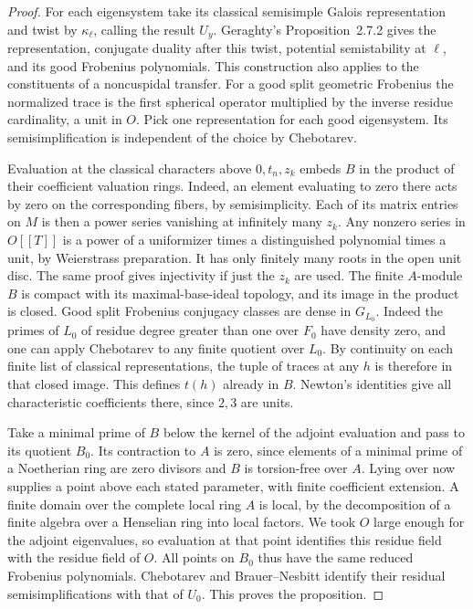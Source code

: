 \documentclass[a4paper,11pt]{article}
\theoremstyle{definition}
\theoremstyle{remark}
\numberwithin{equation}{section}
\begin{document}
\begin{proof}
For each eigensystem take its classical semisimple Galois
representation and twist by \(\kappa_\ell\), calling the result
\(U_y\). Geraghty's Proposition~2.7.2 gives the representation,
conjugate duality after this twist, potential semistability at
\(\ell\), and its good Frobenius polynomials. This construction
also applies to the constituents of a noncuspidal transfer.
For a good split geometric Frobenius the normalized trace
is the first spherical operator multiplied by the inverse
residue cardinality, a unit in \(O\). Pick one representation
for each good eigensystem. Its semisimplification is independent
of the choice by Chebotarev.~\cite{VII-V-geraghty363}

Evaluation at the classical characters above \(0,t_n,z_k\)
embeds \(B\) in the product of their coefficient valuation
rings. Indeed, an element evaluating to zero there acts by zero
on the corresponding fibers, by semisimplicity. Each of its
matrix entries on \(M\) is then a power series vanishing at
infinitely many \(z_k\). Any nonzero series in \(O[[T]]\) is a
power of a uniformizer times a distinguished polynomial times
a unit, by Weierstrass preparation. It has only finitely many
roots in the open unit disc. The same proof gives injectivity
if just the \(z_k\) are used. The finite \(A\)-module \(B\) is
compact with its maximal-base-ideal topology, and its image
in the product is closed. Good split Frobenius conjugacy
classes are dense in \(G_{L_0}\). Indeed the primes of \(L_0\)
of residue degree greater than one over \(F_0\) have density
zero, and one can apply Chebotarev to any finite quotient over
\(L_0\). By continuity on each finite list of classical
representations, the tuple of traces at any \(h\) is therefore
in that closed image. This defines \(t(h)\) already in \(B\).
Newton's identities give all characteristic coefficients there,
since \(2,3\) are units.

Take a minimal prime of \(B\) below the kernel of the adjoint
evaluation and pass to its quotient \(B_0\). Its contraction to
\(A\) is zero, since elements of a minimal prime of a Noetherian
ring are zero divisors and \(B\) is torsion-free over \(A\).
Lying over now supplies a point above each stated parameter,
with finite coefficient extension. A finite domain over the
complete local ring \(A\) is local, by the decomposition of a
finite algebra over a Henselian ring into local factors. We
took \(O\) large enough for the adjoint eigenvalues, so evaluation
at that point identifies this residue field with the residue
field of \(O\). All points on \(B_0\) thus have the same reduced
Frobenius polynomials. Chebotarev and Brauer--Nesbitt identify
their residual semisimplifications with that of \(U_0\).
This proves the proposition.
\end{proof}
\end{document}
